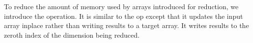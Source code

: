 


To reduce the amount of memory used by arrays introduced for reduction,
we introduce the  operation. It is similar to the 
 op except that it updates the input array inplace
rather than writing results to a target array. It writes results to the 
zeroth index of the dimension being reduced.

  

